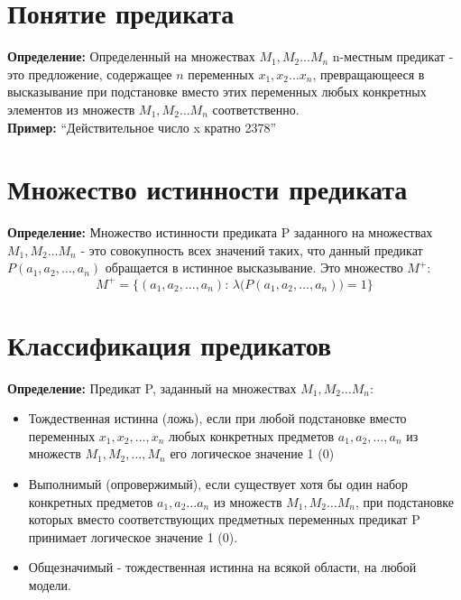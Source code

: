 \documentclass[../main.tex]{subfiles}
\begin{document}
\section{Понятие предиката}
\textbf{Определение:
} Определенный на множествах $M_1,M_2 \ldots M_n$ n-местным предикат - это предложение, содержащее $n$ переменных $x_1,x_2 \ldots x_n$, превращающееся в высказывание при подстановке вместо этих переменных любых конкретных элементов из множеств $M_1,M_2 \ldots M_n$ соответственно. \\
\textbf{Пример:
} ``Действительное число x кратно 2378''

\section{Множество истинности предиката}
\textbf{Определение:
} Множество истинности предиката P заданного на множествах $M_1,M_2 \ldots M_n$ - это совокупность всех значений таких, что данный предикат $P(a_1,a_2,\ldots,a_n)$ обращается в истинное высказывание. Это множество $M^{+}$:
\[M^{+}= \bigl\{(a_1,a_2,\ldots,a_n)\colon\, \lambda \bigl(P(a_1,a_2, \ldots, a_n)\bigr)= 1\bigr\}\]

\section{Классификация предикатов}
\textbf{Определение:
} Предикат P, заданный на множествах $M_1,M_2 \ldots M_n$:
\begin{itemize}
	\item Тождественная истинна (ложь), если при любой подстановке вместо переменных $x_1,x_2,\ldots,x_n$ любых конкретных предметов $a_1,a_2,\ldots,a_n$ из множеств $M_1,M_2,\ldots,M_n$ его логическое значение 1 (0)
	\item Выполнимый (опровержимый), если существует хотя бы один набор конкретных предметов $a_1,a_2 \ldots a_n$ из множеств $M_1,M_2 \ldots M_n$, при подстановке которых вместо соответствующих предметных переменных предикат P принимает логическое значение 1 (0).
	\item Общезначимый - тождественная истинна на всякой области, на любой модели.
\end{itemize}

\end{document}
